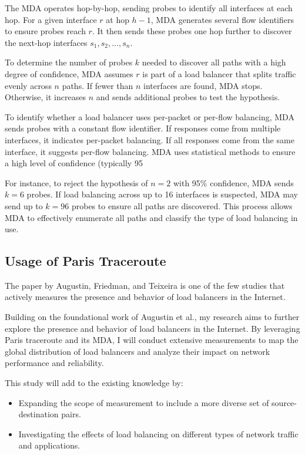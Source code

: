 \documentclass[12pt]{cwru_thesis}
\begin{document}
The MDA operates hop-by-hop, sending probes to identify all interfaces at each hop. For a given interface \(r\) at hop \(h-1\), MDA generates several flow identifiers to ensure probes reach \(r\). It then sends these probes one hop further to discover the next-hop interfaces \(s_1, s_2, \ldots, s_n\).

To determine the number of probes \(k\) needed to discover all paths with a high degree of confidence, MDA assumes \(r\) is part of a load balancer that splits traffic evenly across \(n\) paths. If fewer than \(n\) interfaces are found, MDA stops. Otherwise, it increases \(n\) and sends additional probes to test the hypothesis.

To identify whether a load balancer uses per-packet or per-flow balancing, MDA sends probes with a constant flow identifier. If responses come from multiple interfaces, it indicates per-packet balancing. If all responses come from the same interface, it suggests per-flow balancing. MDA uses statistical methods to ensure a high level of confidence (typically 95%

For instance, to reject the hypothesis of \(n = 2\) with 95\% confidence, MDA sends \(k = 6\) probes. If load balancing across up to 16 interfaces is suspected, MDA may send up to \(k = 96\) probes to ensure all paths are discovered. This process allows MDA to effectively enumerate all paths and classify the type of load balancing in use.




\subsection{Usage of Paris Traceroute}
The paper by Augustin, Friedman, and Teixeira is one of the few studies that actively measures the presence and behavior of load balancers in the Internet.

Building on the foundational work of Augustin et al., my research aims to further explore the presence and behavior of load balancers in the Internet. By leveraging Paris traceroute and its MDA, I will conduct extensive measurements to map the global distribution of load balancers and analyze their impact on network performance and reliability.

This study will add to the existing knowledge by:
\begin{itemize}
    \item Expanding the scope of measurement to include a more diverse set of source-destination pairs.
    \item Investigating the effects of load balancing on different types of network traffic and applications.

\end{itemize}
\newpage
\end{document}
